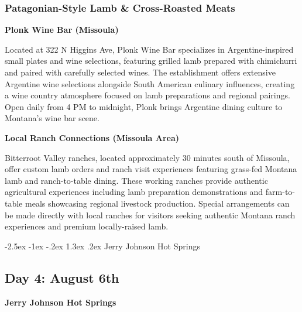 \documentclass[
  11pt,
  letterpaper,
  DIV=10,
  numbers=noendperiod]{scrartcl}
\makeatletter
\renewcommand{\section}{\@startsection{section}{1}{\z@}%
  {-2.5ex \@plus -1ex \@minus -.2ex}%
  {1.3ex \@plus .2ex}%
  {\normalfont\fontsize{16}{19}\bfseries\color{twinpeaksred}}}
\makeatother
\begin{document}
\subsubsection{Patagonian-Style Lamb \& Cross-Roasted
Meats}\label{patagonian-style-lamb-cross-roasted-meats}

\textbf{Plonk Wine Bar (Missoula)}

Located at 322 N Higgins Ave, Plonk Wine Bar specializes in
Argentine-inspired small plates and wine selections, featuring grilled
lamb prepared with chimichurri and paired with carefully selected wines.
The establishment offers extensive Argentine wine selections alongside
South American culinary influences, creating a wine country atmosphere
focused on lamb preparations and regional pairings. Open daily from 4 PM
to midnight, Plonk brings Argentine dining culture to Montana's wine bar
scene.

\textbf{Local Ranch Connections (Missoula Area)}

Bitterroot Valley ranches, located approximately 30 minutes south of
Missoula, offer custom lamb orders and ranch visit experiences featuring
grass-fed Montana lamb and ranch-to-table dining. These working ranches
provide authentic agricultural experiences including lamb preparation
demonstrations and farm-to-table meals showcasing regional livestock
production. Special arrangements can be made directly with local ranches
for visitors seeking authentic Montana ranch experiences and premium
locally-raised lamb.

\newpage

\section{Jerry Johnson Hot Springs}\label{jerry-johnson-hot-springs}

\subsection{Day 4: August 6th}\label{day-4-august-6th}

\textbf{Jerry Johnson Hot Springs}
\end{document}
